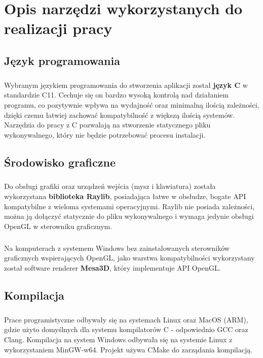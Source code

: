 \documentclass[12pt]{report}
\begin{document}
	
	\chapter{Opis narzędzi wykorzystanych do realizacji pracy}
	\section{Język programowania}
	\paragraph{}
	Wybranym językiem programowania do stworzenia aplikacji został \textbf{język C} w standardzie C11. Cechuje się on bardzo wysoką kontrolą nad działaniem programu, co pozytywnie wpływa na wydajność oraz minimalną ilością zależności, dzięki czemu łatwiej zachować kompatybilność z większą ilością systemów. Narzędzia do pracy z C pozwalają na stworzenie statycznego pliku wykonywalnego, który nie będzie potrzebować procesu instalacji.
	
	\section{Środowisko graficzne}
	\paragraph{}
	Do obsługi grafiki oraz urządzeń wejścia (mysz i klawiatura) została wykorzystana \textbf{biblioteka Raylib}, posiadająca łatwe w obsłudze, bogate API kompatybilne z wieloma systemami operacyjnymi. Raylib nie posiada zależności, można ją dołączyć statycznie do pliku wykonywalnego i wymaga jedynie obsługi OpenGL w sterowniku graficznym.
	\paragraph{}
	Na komputerach z systemem Windows bez zainstalowanych sterowników graficznych wspierających OpenGL, jako warstwa kompatybilności wykorzystany został software renderer \textbf{Mesa3D}, który implementuje API OpenGL.
	
	\section{Kompilacja}
	\paragraph{}
	Prace programistyczne odbywały się na systemach Linux oraz MacOS (ARM), gdzie użyto domyślnych dla systemu kompilatorów C - odpowiednio GCC oraz Clang. Kompilacja na system Windows odbywała się na systemie Linux z wykorzystaniem MinGW-w64. Projekt używa CMake do zarządania kompilacją.
	
\end{document}
